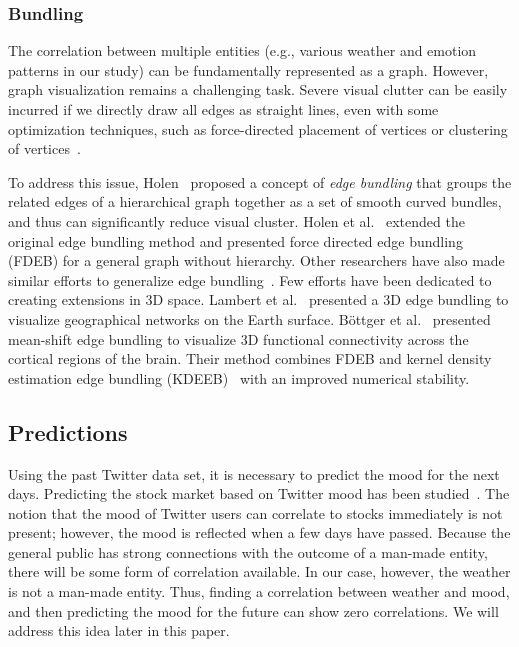 \subsubsection{Bundling}

The correlation between multiple entities (e.g., various weather and emotion patterns in our study) can be fundamentally represented as a graph. However, graph visualization remains a challenging task. Severe visual clutter can be easily incurred if we directly draw all edges as straight lines, even with some optimization techniques, such as force-directed placement of vertices or clustering of vertices~\cite{KAUFMANN2001}.

To address this issue, Holen~\cite{holten2006hierarchical} proposed a concept of \emph{edge bundling} that groups the related edges of a hierarchical graph together as a set of smooth curved bundles, and thus can significantly reduce visual cluster. Holen et al.~\cite{holten2009force} extended the original edge bundling method and presented force directed edge bundling (FDEB) for a general graph without hierarchy. Other researchers have also made similar efforts to generalize edge bundling~\cite{cui2008geometry,telea2010image,ersoy2011skeleton,gansner2011multilevel}. Few efforts have been dedicated to creating extensions in 3D space. Lambert et al.~\cite{5571244} presented a 3D edge bundling to visualize geographical networks on the Earth surface. B\"{o}ttger et al.~\cite{bottger2014three} presented mean-shift edge bundling to visualize 3D functional connectivity across the cortical regions of the brain. Their method combines FDEB and kernel density estimation edge bundling (KDEEB)~\cite{hurter2012graph} with an improved numerical stability.

\subsection{Predictions}

Using the past Twitter data set, it is necessary to predict the mood for the next days. Predicting the stock market based on Twitter mood has been studied~\cite{bollen2011twitter}. The notion that the mood of Twitter users can correlate to stocks immediately is not present; however, the mood is reflected when a few days have passed. Because the general public has strong connections with the outcome of a man-made entity, there will be some form of correlation available. In our case, however, the weather is not a man-made entity. Thus, finding a correlation between weather and mood, and then predicting the mood for the future can show zero correlations. We will address this idea later in this paper.
